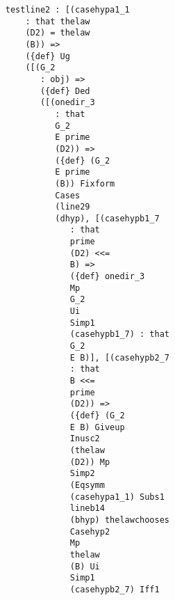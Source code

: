 \documentclass[12pt]{article}
\begin{document}
\begin{verbatim}
                              testline2 : [(casehypa1_1 
                                  : that thelaw 
                                  (D2) = thelaw 
                                  (B)) => 
                                  ({def} Ug 
                                  ([(G_2 
                                     : obj) => 
                                     ({def} Ded 
                                     ([(onedir_3 
                                        : that 
                                        G_2 
                                        E prime 
                                        (D2)) => 
                                        ({def} (G_2 
                                        E prime 
                                        (B)) Fixform 
                                        Cases 
                                        (line29 
                                        (dhyp), [(casehypb1_7 
                                           : that 
                                           prime 
                                           (D2) <<= 
                                           B) => 
                                           ({def} onedir_3 
                                           Mp 
                                           G_2 
                                           Ui 
                                           Simp1 
                                           (casehypb1_7) : that 
                                           G_2 
                                           E B)], [(casehypb2_7 
                                           : that 
                                           B <<= 
                                           prime 
                                           (D2)) => 
                                           ({def} (G_2 
                                           E B) Giveup 
                                           Inusc2 
                                           (thelaw 
                                           (D2)) Mp 
                                           Simp2 
                                           (Eqsymm 
                                           (casehypa1_1) Subs1 
                                           lineb14 
                                           (bhyp) thelawchooses 
                                           Casehyp2 
                                           Mp 
                                           thelaw 
                                           (B) Ui 
                                           Simp1 
                                           (casehypb2_7) Iff1 

\end{verbatim}
\end{document}
